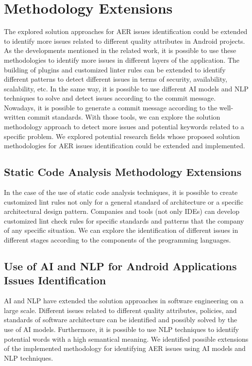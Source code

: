 \chapter{Methodology Extensions}
\label{cha:extensions}

The explored solution approaches for AER issues identification could be extended to identify more issues related to different quality attributes in Android projects. As the developments mentioned in the related work, it is possible to use these methodologies to identify more issues in different layers of the application. The building of plugins and customized linter rules can be extended to identify different patterns to detect different issues in terms of security, availability, scalability, etc. In the same way, it is possible to use different AI models and NLP techniques to solve and detect issues according to the commit message. Nowadays, it is possible to generate a commit message according to the well-written commit standards. With those tools, we can explore the solution methodology approach to detect more issues and potential keywords related to a specific problem. We explored potential research fields whose proposed solution methodologies for AER issues identification could be extended and implemented.


\section{Static Code Analysis Methodology Extensions}
In the case of the use of static code analysis techniques, it is possible to create customized lint rules not only for a general standard of architecture or a specific architectural design pattern. Companies and tools (not only IDEs) can develop customized lint check rules for specific standards and patterns that the company of any specific situation.
We can explore the identification of different issues in different stages according to the components of the programming languages.

\section{Use of AI and NLP for Android Applications Issues Identification}
AI and NLP have extended the solution approaches in software engineering on a large scale. Different issues related to different quality attributes, policies, and standards of software architecture can be identified and possibly solved by the use of AI models. Furthermore, it is possible to use NLP techniques to identify potential words with a high semantical meaning. We identified possible extensions of the implemented methodology for identifying AER issues using AI models and NLP techniques.

